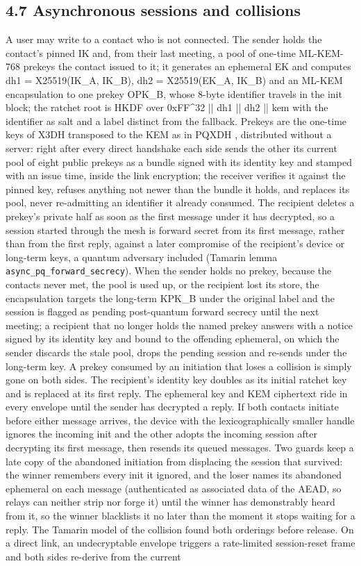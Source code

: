 \documentclass[conference]{IEEEtran}
\begin{document}
\subsection{4.7 Asynchronous sessions and collisions}
A user may write to a contact who is not connected. The sender holds the contact's pinned IK and, from their last meeting, a pool of one-time ML-KEM-768 prekeys the contact issued to it; it generates an ephemeral EK and computes dh1 = X25519(IK\_A, IK\_B), dh2 = X25519(EK\_A, IK\_B) and an ML-KEM encapsulation to one prekey OPK\_B, whose 8-byte identifier travels in the init block; the ratchet root is HKDF over 0xFF\textasciicircum{}32 || dh1 || dh2 || kem with the identifier as salt and a label distinct from the fallback. Prekeys are the one-time keys of X3DH \cite{ref1} transposed to the KEM as in PQXDH \cite{ref4}, distributed without a server: right after every direct handshake each side sends the other its current pool of eight public prekeys as a bundle signed with its identity key and stamped with an issue time, inside the link encryption; the receiver verifies it against the pinned key, refuses anything not newer than the bundle it holds, and replaces its pool, never re-admitting an identifier it already consumed. The recipient deletes a prekey's private half as soon as the first message under it has decrypted, so a session started through the mesh is forward secret from its first message, rather than from the first reply, against a later compromise of the recipient's device or long-term keys, a quantum adversary included (Tamarin lemma \texttt{async\_pq\_forward\_secrecy}). When the sender holds no prekey, because the contacts never met, the pool is used up, or the recipient lost its store, the encapsulation targets the long-term KPK\_B under the original label and the session is flagged as pending post-quantum forward secrecy until the next meeting; a recipient that no longer holds the named prekey answers with a notice signed by its identity key and bound to the offending ephemeral, on which the sender discards the stale pool, drops the pending session and re-sends under the long-term key. A prekey consumed by an initiation that loses a collision is simply gone on both sides. The recipient's identity key doubles as its initial ratchet key and is replaced at its first reply. The ephemeral key and KEM ciphertext ride in every envelope until the sender has decrypted a reply. If both contacts initiate before either message arrives, the device with the lexicographically smaller handle ignores the incoming init and the other adopts the incoming session after decrypting its first message, then resends its queued messages. Two guards keep a late copy of the abandoned initiation from displacing the session that survived: the winner remembers every init it ignored, and the loser names its abandoned ephemeral on each message (authenticated as associated data of the AEAD, so relays can neither strip nor forge it) until the winner has demonstrably heard from it, so the winner blacklists it no later than the moment it stops waiting for a reply. The Tamarin model of the collision found both orderings before release. On a direct link, an undecryptable envelope triggers a rate-limited session-reset frame and both sides re-derive from the current 
\end{document}
